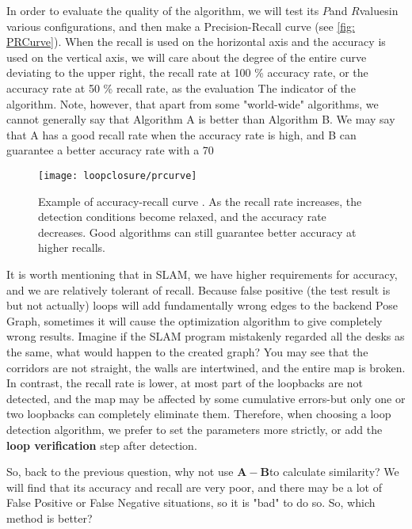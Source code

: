 In order to evaluate the quality of the algorithm, we will test its $P $and $R $values ​​in various configurations, and then make a Precision-Recall curve (see \autoref{fig: PRCurve}). When the recall is used on the horizontal axis and the accuracy is used on the vertical axis, we will care about the degree of the entire curve deviating to the upper right, the recall rate at 100 \% accuracy rate, or the accuracy rate at 50 \% recall rate, as the evaluation The indicator of the algorithm. Note, however, that apart from some "world-wide" algorithms, we cannot generally say that Algorithm A is better than Algorithm B. We may say that A has a good recall rate when the accuracy rate is high, and B can guarantee a better accuracy rate with a 70%

\begin{figure}[! ht]
\centering
\texttt{[image: loopclosure/prcurve]}
\caption{Example of accuracy-recall curve \textsuperscript{\cite{Gao2015a}}. As the recall rate increases, the detection conditions become relaxed, and the accuracy rate decreases. Good algorithms can still guarantee better accuracy at higher recalls. }
\label{fig: PRCurve}
\end{figure}

It is worth mentioning that in SLAM, we have higher requirements for accuracy, and we are relatively tolerant of recall. Because false positive (the test result is but not actually) loops will add fundamentally wrong edges to the backend Pose Graph, sometimes it will cause the optimization algorithm to give completely wrong results. Imagine if the SLAM program mistakenly regarded all the desks as the same, what would happen to the created graph? You may see that the corridors are not straight, the walls are intertwined, and the entire map is broken. In contrast, the recall rate is lower, at most part of the loopbacks are not detected, and the map may be affected by some cumulative errors-but only one or two loopbacks can completely eliminate them. Therefore, when choosing a loop detection algorithm, we prefer to set the parameters more strictly, or add the \textbf{loop verification} step after detection.

So, back to the previous question, why not use $\bm{A}-\bm{B} $to calculate similarity? We will find that its accuracy and recall are very poor, and there may be a lot of False Positive or False Negative situations, so it is "bad" to do so. So, which method is better?

